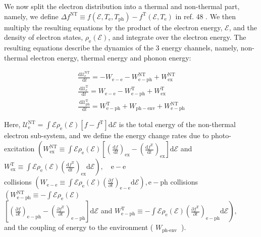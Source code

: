 \documentclass[10pt]{article}
\begin{document}
We now split the electron distribution into a thermal and non-thermal part, namely, we define $\Delta f^{\mathrm{NT}} \equiv f\left(\mathcal{E}, T_{\mathrm{e}}, T_{\mathrm{ph}}\right)-f^{\mathrm{T}}\left(\mathcal{E}, T_{\mathrm{e}}\right)$ in ref. 48 . We then multiply the resulting equations by the product of the electron energy, $\mathcal{E}$, and the density of electron states, $\rho_{\mathrm{e}}(\mathcal{E})$, and integrate over the electron energy. The resulting equations describe the dynamics of the 3 energy channels, namely, non-thermal electron energy, thermal energy and phonon energy:

$$
\begin{gathered}
\frac{\mathrm{d} \mathcal{U}_{\mathrm{e}}^{\mathrm{NT}}}{\mathrm{~d} t}=-W_{\mathrm{e}-\mathrm{e}}-W_{\mathrm{e}-\mathrm{ph}}^{\mathrm{NT}}+W_{\mathrm{ex}}^{\mathrm{NT}} \\
\frac{\mathrm{~d} \mathcal{U}_{\mathrm{e}}^{\mathrm{T}}}{\mathrm{~d} t}=W_{\mathrm{e}-\mathrm{e}}-W_{\mathrm{e}-\mathrm{ph}}^{\mathrm{T}}+W_{\mathrm{ex}}^{\mathrm{T}} \\
\frac{\mathrm{~d} \mathcal{U}_{\mathrm{ph}}^{\mathrm{T}}}{\mathrm{~d} t}=W_{\mathrm{e}-\mathrm{ph}}^{\mathrm{T}}+W_{\mathrm{ph}-\mathrm{env}}+W_{\mathrm{e}-\mathrm{ph}}^{\mathrm{NT}}
\end{gathered}
$$

Here, $\mathcal{U}_{\mathrm{e}}^{\mathrm{NT}}=\int \mathcal{E} \rho_{\mathrm{e}}(\mathcal{E})\left[f-f^{\mathrm{T}}\right] \mathrm{d} \mathcal{E}$ is the total energy of the non-thermal electron sub-system, and we define the energy change rates due to photo-excitation $\left(W_{\mathrm{ex}}^{\mathrm{NT}} \equiv \int \mathcal{E} \rho_{\mathrm{e}}(\mathcal{E})\left[\left(\frac{\mathrm{d} f}{\mathrm{~d} t}\right)_{\mathrm{ex}}-\left(\frac{\mathrm{d} f^{\mathrm{T}}}{\mathrm{d} t}\right)_{\mathrm{ex}}\right] \mathrm{d} \mathcal{E}\right.$ and $\left.W_{\mathrm{ex}}^{\mathrm{T}} \equiv \int \mathcal{E} \rho_{\mathrm{e}}(\mathcal{E})\left(\frac{\mathrm{d} f^{\mathrm{T}}}{\mathrm{d} t}\right)_{\mathrm{ex}} \mathrm{d} \mathcal{E}\right), \quad \mathrm{e}-\mathrm{e}$\\
collisions $\left(W_{\mathrm{e}-\mathrm{e}} \equiv \int \mathcal{E} \rho_{\mathrm{e}}(\mathcal{E})\left(\frac{\partial f}{\partial t}\right)_{\mathrm{e}-\mathrm{e}} \mathrm{d} \mathcal{E}\right), \mathrm{e}-\mathrm{ph}$ collisions $\left(W_{\mathrm{e}-\mathrm{ph}}^{\mathrm{NT}} \equiv-\int \mathcal{E} \rho_{\mathrm{e}}(\mathcal{E})\right.$\\
$\left[\left(\frac{\partial f}{\partial t}\right)_{\mathrm{e}-\mathrm{ph}}-\left(\frac{\partial f^{\mathrm{T}}}{\partial t}\right)_{\mathrm{e}-\mathrm{ph}}\right] \mathrm{d} \mathcal{E}$ and $\left.W_{\mathrm{e}-\mathrm{ph}}^{\mathrm{T}} \equiv-\int \mathcal{E} \rho_{\mathrm{e}}(\mathcal{E})\left(\frac{\partial f^{\mathrm{T}}}{\partial t}\right)_{\mathrm{e}-\mathrm{ph}} \mathrm{d} \mathcal{E}\right), \quad$ and the coupling of energy to the environment ( $W_{\text {ph-env }}$ ).
\end{document}
